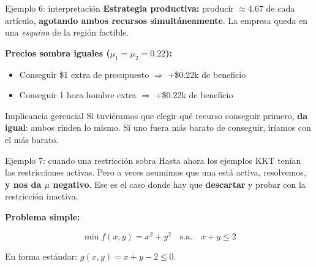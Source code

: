 \documentclass{beamer}
\begin{document}
\begin{frame}{Ejemplo 6: interpretación}
    \small
    \textbf{Estrategia productiva:} producir $\approx 4.67$ de cada artículo, \textbf{agotando ambos recursos simultáneamente}. La empresa queda en una \textit{esquina} de la región factible.

    \vspace{0.5em}

    \textbf{Precios sombra iguales ($\mu_1 = \mu_2 = 0.22$):}
    \begin{itemize}
        \item Conseguir \$1 extra de presupuesto $\Rightarrow$ +\$0.22k de beneficio
        \item Conseguir 1 hora hombre extra $\Rightarrow$ +\$0.22k de beneficio
    \end{itemize}

    \vspace{0.5em}

    \begin{alertblock}{Implicancia gerencial}
        Si tuviéramos que elegir qué recurso conseguir primero, \textbf{da igual}: ambos rinden lo mismo. Si uno fuera más barato de conseguir, iríamos con el más barato.
    \end{alertblock}
\end{frame}



\begin{frame}{Ejemplo 7: cuando una restricción sobra}
    \small
    Hasta ahora los ejemplos KKT tenían las restricciones activas. Pero a veces asumimos que una está activa, resolvemos, \textbf{y nos da $\mu$ negativo}. Ese es el caso donde hay que \textbf{descartar} y probar con la restricción inactiva.

    \vspace{0.5em}

    \textbf{Problema simple:}

    \[
    \min f(x, y) = x^2 + y^2 \quad \text{s.a.} \quad x + y \leq 2
    \]

    \vspace{0.3em}

    En forma estándar: $g(x, y) = x + y - 2 \leq 0$.
\end{frame}
\end{document}
